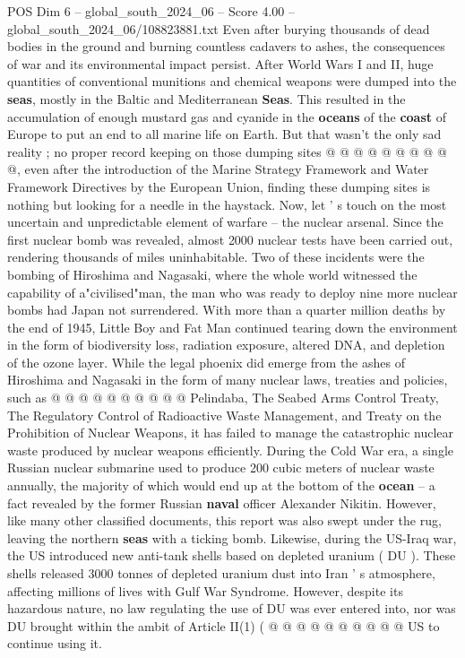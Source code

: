 \begin{textsample}{POS Dim 6 – global\_south\_2024\_06 – Score 4.00 – global\_south\_2024\_06/108823881.txt}
Even after burying thousands of dead bodies in the ground and burning countless cadavers to ashes, the consequences of war and its environmental impact persist.
After World Wars I and II, huge quantities of conventional munitions and chemical weapons were dumped into the \textbf{seas}, mostly in the Baltic and Mediterranean \textbf{Seas}.
This resulted in the accumulation of enough mustard gas and cyanide in the \textbf{oceans} of the \textbf{coast} of Europe to put an end to all marine life on Earth.
But that wasn't the only sad reality ; no proper record keeping on those dumping sites @ @ @ @ @ @ @ @ @ @, even after the introduction of the Marine Strategy Framework and Water Framework Directives by the European Union, finding these dumping sites is nothing but looking for a needle in the haystack.
Now, let ' s touch on the most uncertain and unpredictable element of warfare -- the nuclear arsenal.
Since the first nuclear bomb was revealed, almost 2000 nuclear tests have been carried out, rendering thousands of miles uninhabitable.
Two of these incidents were the bombing of Hiroshima and Nagasaki, where the whole world witnessed the capability of a"civilised"man, the man who was ready to deploy nine more nuclear bombs had Japan not surrendered.
With more than a quarter million deaths by the end of 1945, Little Boy and Fat Man continued tearing down the environment in the form of biodiversity loss, radiation exposure, altered DNA, and depletion of the ozone layer.
While the legal phoenix did emerge from the ashes of Hiroshima and Nagasaki in the form of many nuclear laws, treaties and policies, such as @ @ @ @ @ @ @ @ @ @ Pelindaba, The Seabed Arms Control Treaty, The Regulatory Control of Radioactive Waste Management, and Treaty on the Prohibition of Nuclear Weapons, it has failed to manage the catastrophic nuclear waste produced by nuclear weapons efficiently.
During the Cold War era, a single Russian nuclear submarine used to produce 200 cubic meters of nuclear waste annually, the majority of which would end up at the bottom of the \textbf{ocean} -- a fact revealed by the former Russian \textbf{naval} officer Alexander Nikitin.
However, like many other classified documents, this report was also swept under the rug, leaving the northern \textbf{seas} with a ticking bomb.
Likewise, during the US-Iraq war, the US introduced new anti-tank shells based on depleted uranium ( DU ).
These shells released 3000 tonnes of depleted uranium dust into Iran ' s atmosphere, affecting millions of lives with Gulf War Syndrome.
However, despite its hazardous nature, no law regulating the use of DU was ever entered into, nor was DU brought within the ambit of Article II(1) ( @ @ @ @ @ @ @ @ @ @ US to continue using it.

\end{textsample}
